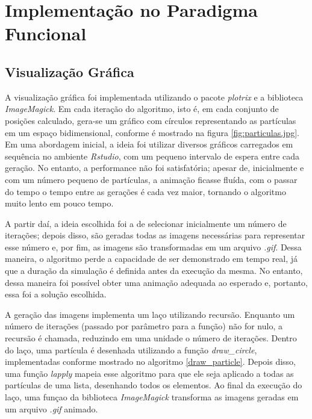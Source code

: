 \documentclass[rel_mlp]{iiufrgs}
\begin{document}
\section{Implementação no Paradigma Funcional}

\subsection{Visualização Gráfica}

	A visualização gráfica foi implementada utilizando o pacote \textit{plotrix} e a biblioteca \textit{ImageMagick}. Em cada iteração do algoritmo, isto é, em cada conjunto de posições calculado, gera-se um gráfico com círculos representando as partículas em um espaço bidimensional, conforme é mostrado na figura \ref{fig:particulas.jpg}.
    Em uma abordagem inicial, a ideia foi utilizar diversos gráficos carregados em sequência no ambiente \textit{Rstudio}, com um pequeno intervalo de espera entre cada geração. No entanto, a performance não foi satisfatória; apesar de, inicialmente e com um número pequeno de partículas, a animação ficasse fluída, com o passar do tempo o tempo entre as gerações é cada vez maior, tornando o algoritmo muito lento em pouco tempo.

    A partir daí, a ideia escolhida foi a de selecionar inicialmente um número de iterações; depois disso, são geradas todas as imagens necessárias para representar esse número e, por fim, as imagens são transformadas em um arquivo \textit{.gif}. Dessa maneira, o algoritmo perde a capacidade de ser demonstrado em tempo real, já que a duração da simulação é definida antes da execução da mesma. No entanto, dessa maneira foi possível obter uma animação adequada ao esperado e, portanto, essa foi a solução escolhida.

    A geração das imagens implementa um laço utilizando recursão. Enquanto um número de iterações (passado por parâmetro para a função) não for nulo, a recursão é chamada, reduzindo em uma unidade o número de iterações.
    Dentro do laço, uma partícula é desenhada utilizando a função \textit{draw{\_}circle}, implementadas conforme mostrado no algoritmo \ref{draw_particle}. Depois disso, uma função \textit{lapply} mapeia esse algoritmo para que ele seja aplicado a todas as partículas de uma lista, desenhando todos os elementos.
    Ao final da execução do laço, uma funçao da biblioteca \textit{ImageMagick} transforma as imagens geradas em um arquivo \textit{.gif} animado.
\end{document}
